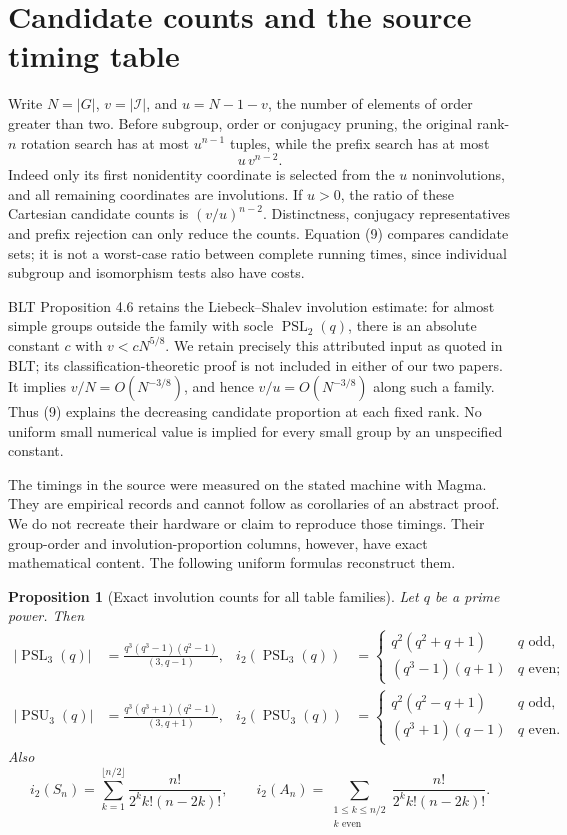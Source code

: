 \documentclass[11pt]{article}
\newtheorem{proposition}[theorem]{Proposition}
\theoremstyle{remark}\newtheorem{remark}[theorem]{Remark}
\newcommand{\PSL}{\operatorname{PSL}}
\newcommand{\PSU}{\operatorname{PSU}}
\begin{document}
\section{Candidate counts and the source timing table}

Write $N=|G|$, $v=|\mathcal I|$, and $u=N-1-v$, the number of elements of order greater than two. Before subgroup, order or conjugacy pruning, the original rank-$n$ rotation search has at most $u^{n-1}$ tuples, while the prefix search has at most
\[
 u\,v^{n-2}.
 \tag{9}
\]
Indeed only its first nonidentity coordinate is selected from the $u$ noninvolutions, and all remaining coordinates are involutions. If $u>0$, the ratio of these Cartesian candidate counts is $(v/u)^{n-2}$. Distinctness, conjugacy representatives and prefix rejection can only reduce the counts. Equation (9) compares candidate sets; it is not a worst-case ratio between complete running times, since individual subgroup and isomorphism tests also have costs.

BLT Proposition 4.6 retains the Liebeck--Shalev involution estimate: for almost simple groups outside the family with socle $\PSL_2(q)$, there is an absolute constant $c$ with $v<cN^{5/8}$. We retain precisely this attributed input as quoted in BLT; its classification-theoretic proof is not included in either of our two papers. It implies $v/N=O(N^{-3/8})$, and hence $v/u=O(N^{-3/8})$ along such a family. Thus (9) explains the decreasing candidate proportion at each fixed rank. No uniform small numerical value is implied for every small group by an unspecified constant.

The timings in the source were measured on the stated machine with Magma. They are empirical records and cannot follow as corollaries of an abstract proof. We do not recreate their hardware or claim to reproduce those timings. Their group-order and involution-proportion columns, however, have exact mathematical content. The following uniform formulas reconstruct them.

\begin{proposition}[Exact involution counts for all table families]
Let $q$ be a prime power. Then
\begin{align*}
 |\PSL_3(q)|&=\frac{q^3(q^3-1)(q^2-1)}{(3,q-1)},&
 i_2(\PSL_3(q))&=\begin{cases}q^2(q^2+q+1)&q\text{ odd},\\(q^3-1)(q+1)&q\text{ even};\end{cases}\\
 |\PSU_3(q)|&=\frac{q^3(q^3+1)(q^2-1)}{(3,q+1)},&
 i_2(\PSU_3(q))&=\begin{cases}q^2(q^2-q+1)&q\text{ odd},\\(q^3+1)(q-1)&q\text{ even}.
 \end{cases}
\end{align*}
Also
\[
 i_2(S_n)=\sum_{k=1}^{\lfloor n/2\rfloor}\frac{n!}{2^k k!(n-2k)!},\qquad
 i_2(A_n)=\sum_{\substack{1\leq k\leq n/2\\k\text{ even}}}\frac{n!}{2^k k!(n-2k)!}.
 \tag{10}
\]
\end{proposition}
\end{document}
